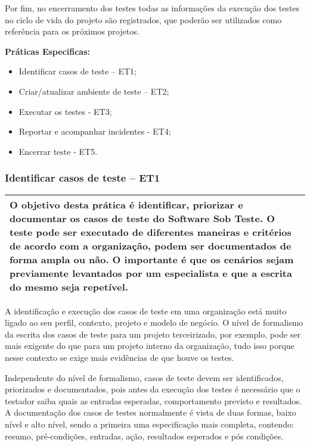 Por fim, no encerramento dos testes todas as informações da execução dos testes no ciclo de vida do projeto são registrados, que poderão ser utilizados como referência para os próximos projetos.

\textbf{Práticas Especificas:}
\begin{itemize}
    \item Identificar casos de teste – ET1;
    \item Criar/atualizar ambiente de teste – ET2;
    \item Executar os testes - ET3;
    \item Reportar e acompanhar incidentes - ET4;
    \item Encerrar teste - ET5.
\end{itemize}

\subsubsection{Identificar casos de teste – ET1}
\label{sec:et1}

\begin{table}[!ht]
\centering
\begin{tabular}{|p{130mm}|}
\hline
O objetivo desta prática é identificar, priorizar e documentar os casos de teste do Software Sob Teste. O teste pode ser executado de diferentes maneiras e critérios de acordo com a organização, podem ser documentados de forma ampla ou não. O importante é que os cenários sejam previamente levantados por um especialista e que a escrita do mesmo seja repetível. \\ 
\hline
\end{tabular}
\end{table}

A identificação e execução dos casos de teste em uma organização está muito ligado ao seu perfil, contexto, projeto e modelo de negócio. O nível de formalismo da escrita dos casos de teste para um projeto terceirizado, por exemplo, pode ser mais exigente do que para um projeto interno da organização, tudo isso porque nesse contexto se exige mais evidências de que houve os testes.

Independente do nível de formalismo, casos de teste devem ser identificados, priorizados e documentados, pois antes da execução dos testes é necessário que o testador saiba quais as entradas esperadas, comportamento previsto e resultados. A documentação dos casos de testes normalmente é vista de duas formas, baixo nível e alto nível, sendo a primeira uma especificação mais completa, contendo: resumo, pré-condições, entradas, ação, resultados esperados e pós condições.

